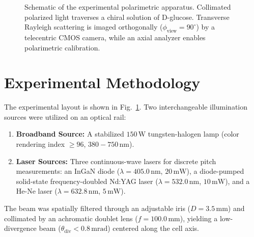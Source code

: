 \documentclass[twocolumn,10pt,a4paper]{article}
\begin{document}
\begin{figure}[t]
  \caption{Schematic of the experimental polarimetric apparatus. Collimated polarized light traverses a chiral solution of D-glucose. Transverse Rayleigh scattering is imaged orthogonally ($\phi_{\text{view}} = 90^\circ$) by a telecentric CMOS camera, while an axial analyzer enables polarimetric calibration.}
  \label{fig:setup}
\end{figure}

\section{Experimental Methodology}

The experimental layout is shown in Fig.~\ref{fig:setup}. Two interchangeable illumination sources were utilized on an optical rail:
\begin{enumerate}
  \item \textbf{Broadband Source:} A stabilized $150\,\text{W}$ tungsten-halogen lamp (color rendering index $\ge 96$, $380-750\,\text{nm}$).
  \item \textbf{Laser Sources:} Three continuous-wave lasers for discrete pitch measurements: an InGaN diode ($\lambda = 405.0\,\text{nm}$, $20\,\text{mW}$), a diode-pumped solid-state frequency-doubled Nd:YAG laser ($\lambda = 532.0\,\text{nm}$, $10\,\text{mW}$), and a He-Ne laser ($\lambda = 632.8\,\text{nm}$, $5\,\text{mW}$).
\end{enumerate}
The beam was spatially filtered through an adjustable iris ($D = 3.5\,\text{mm}$) and collimated by an achromatic doublet lens ($f = 100.0\,\text{mm}$), yielding a low-divergence beam ($\theta_{\text{div}} < 0.8\,\text{mrad}$) centered along the cell axis.
\end{document}
